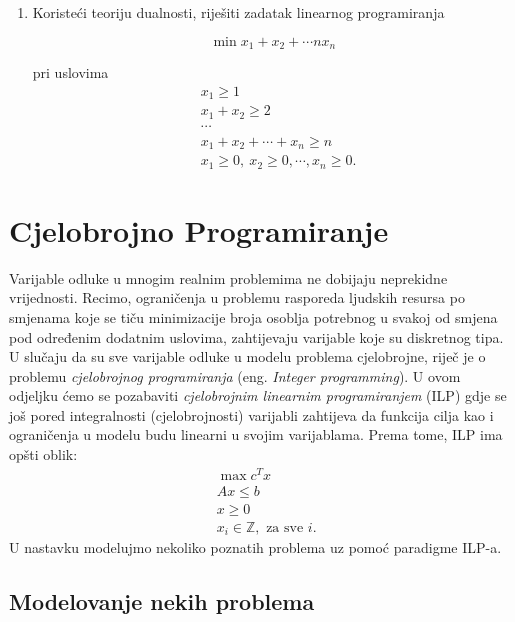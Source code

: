 \documentclass[a4paper, utf8, 11pt, colorlinks]{book}
\begin{document}
\begin{enumerate}
\item Koristeći teoriju dualnosti, riješiti zadatak linearnog programiranja

$$\min x_1+x_2+\cdots nx_n$$

pri uslovima
$$
\begin{aligned}
	& x_1\geqslant 1\\
	& x_1+x_2\geqslant 2 \\
	& \cdots\\
	& x_1+x_2+\cdots+x_n\geqslant n\\
	&x_1\geqslant 0,\ x_2\geqslant 0,\cdots,x_n\geqslant 0.
\end{aligned}$$
\end{enumerate}
\newpage
\chapter{Cjelobrojno Programiranje}

 Varijable odluke u mnogim realnim problemima ne dobijaju neprekidne vrijednosti. Recimo, ograničenja u problemu rasporeda ljudskih resursa po smjenama koje se tiču minimizacije  broja osoblja potrebnog u svakoj od smjena pod određenim dodatnim uslovima, zahtijevaju varijable koje su diskretnog tipa. U slučaju da su sve varijable odluke u modelu problema cjelobrojne, riječ je o problemu \emph{cjelobrojnog programiranja} (eng. \emph{Integer programming}). 
U ovom odjeljku ćemo se pozabaviti   \emph{cjelobrojnim linearnim programiranjem} (ILP) gdje se još pored integralnosti (cjelobrojnosti) varijabli zahtijeva da funkcija cilja kao i ograničenja u modelu budu linearni u svojim varijablama. Prema tome, ILP ima opšti oblik:
\begin{align}
    & \max c^T x \nonumber\\
    & A x \leq b \nonumber \\
    & x \geq 0 \nonumber\\
    & x_i \in \mathbb{Z}, \mbox{ za sve } i. \label{ilp-formulation}
\end{align}
U nastavku modelujmo nekoliko poznatih problema uz pomoć paradigme ILP-a. 

\section{Modelovanje nekih problema}
\end{document}
